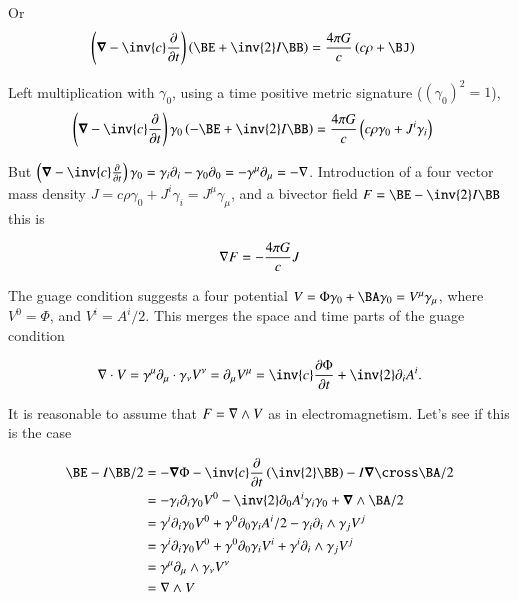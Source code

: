 \documentclass{article}
\begin{document}
Or
\begin{align}
\left( \spacegrad -\inv{c} \PD{t}{}\right) \left( \BE + \inv{2} I \BB \right) &= \frac{4\pi G}{c} \left( c \rho + \BJ \right)
\end{align}

Left multiplication with $\gamma_0$, using a time positive metric signature ($(\gamma_0)^2=1$), 
\begin{align}
\left( \spacegrad -\inv{c} \PD{t}{}\right) \gamma_0 \left( -\BE + \inv{2} I \BB \right) &= \frac{4\pi G}{c} \left( c \rho \gamma_0 + J^i \gamma_i \right)
\end{align}

But $\left( \spacegrad -\inv{c} \PD{t}{}\right) \gamma_0 = \gamma_i \partial_i - \gamma_0 \partial_0 = -\gamma^\mu \partial_\mu = -\grad$.  Introduction of a four vector mass density $J = c\rho \gamma_0 + J^i \gamma_i = J^\mu \gamma_\mu$, and a bivector field $F = \BE -\inv{2} I \BB$ this is

\begin{align}
\nabla F = -\frac{4\pi G}{c} J
\end{align}

The guage condition suggests a four potential $V = \Phi \gamma_0 + \BA \gamma_0 = V^\mu \gamma_\mu$, where $V^0 = \Phi$, and $V^i = A^i/2$.  This merges the
space and time parts of the guage condition

\begin{align*}
\grad \cdot V = \gamma^\mu \partial_\mu \cdot \gamma_\nu V^\nu = \partial_\mu V^\mu = \inv{c}\PD{t}{\Phi} + \inv{2}\partial_i A^i.
\end{align*}

It is reasonable to assume that $F = \nabla \wedge V$ as in electromagnetism.  Let's see if this is the case

\begin{align*}
\BE - I\BB/2 
&= - \spacegrad \Phi -\inv{c} \PD{t}{}\left( \inv{2} \BB \right) - I\spacegrad \cross \BA/2 \\
&= - \gamma_i \partial_i \gamma_0 V^0 - \inv{2} \partial_0 A^i \gamma_i \gamma_0 + \spacegrad \wedge \BA/2 \\
&= \gamma^i \partial_i \gamma_0 V^0 + \gamma^0 \partial_0 \gamma_i A^i/2 - \gamma_i \partial_i \wedge \gamma_j V^j \\
&= \gamma^i \partial_i \gamma_0 V^0 + \gamma^0 \partial_0 \gamma_i V^i + \gamma^i \partial_i \wedge \gamma_j V^j \\
&= \gamma^\mu \partial_\mu \wedge \gamma_\nu V^\nu \\
&= \grad \wedge V
\end{align*}
\end{document}
